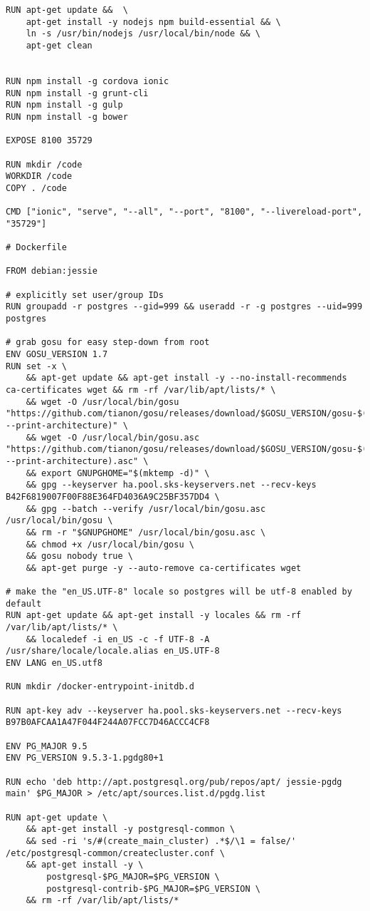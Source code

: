 \documentclass[
	12pt,				%
	openright,			%
	oneside,			%
	a4paper,			%
	chapter=TITLE,		%
	section=TITLE,		%
	english,			%
	french,				%
	spanish,			%
	brazil				%
	]{abntex2}
\begin{document}
\begin{apendicesenv}
\begin{lstlisting}
RUN apt-get update &&  \
    apt-get install -y nodejs npm build-essential && \
    ln -s /usr/bin/nodejs /usr/local/bin/node && \ 
    apt-get clean


RUN npm install -g cordova ionic
RUN npm install -g grunt-cli
RUN npm install -g gulp
RUN npm install -g bower

EXPOSE 8100 35729

RUN mkdir /code
WORKDIR /code
COPY . /code

CMD ["ionic", "serve", "--all", "--port", "8100", "--livereload-port", "35729"]

# Dockerfile

FROM debian:jessie

# explicitly set user/group IDs
RUN groupadd -r postgres --gid=999 && useradd -r -g postgres --uid=999 postgres

# grab gosu for easy step-down from root
ENV GOSU_VERSION 1.7
RUN set -x \
	&& apt-get update && apt-get install -y --no-install-recommends ca-certificates wget && rm -rf /var/lib/apt/lists/* \
	&& wget -O /usr/local/bin/gosu "https://github.com/tianon/gosu/releases/download/$GOSU_VERSION/gosu-$(dpkg --print-architecture)" \
	&& wget -O /usr/local/bin/gosu.asc "https://github.com/tianon/gosu/releases/download/$GOSU_VERSION/gosu-$(dpkg --print-architecture).asc" \
	&& export GNUPGHOME="$(mktemp -d)" \
	&& gpg --keyserver ha.pool.sks-keyservers.net --recv-keys B42F6819007F00F88E364FD4036A9C25BF357DD4 \
	&& gpg --batch --verify /usr/local/bin/gosu.asc /usr/local/bin/gosu \
	&& rm -r "$GNUPGHOME" /usr/local/bin/gosu.asc \
	&& chmod +x /usr/local/bin/gosu \
	&& gosu nobody true \
	&& apt-get purge -y --auto-remove ca-certificates wget

# make the "en_US.UTF-8" locale so postgres will be utf-8 enabled by default
RUN apt-get update && apt-get install -y locales && rm -rf /var/lib/apt/lists/* \
	&& localedef -i en_US -c -f UTF-8 -A /usr/share/locale/locale.alias en_US.UTF-8
ENV LANG en_US.utf8

RUN mkdir /docker-entrypoint-initdb.d

RUN apt-key adv --keyserver ha.pool.sks-keyservers.net --recv-keys B97B0AFCAA1A47F044F244A07FCC7D46ACCC4CF8

ENV PG_MAJOR 9.5
ENV PG_VERSION 9.5.3-1.pgdg80+1

RUN echo 'deb http://apt.postgresql.org/pub/repos/apt/ jessie-pgdg main' $PG_MAJOR > /etc/apt/sources.list.d/pgdg.list

RUN apt-get update \
	&& apt-get install -y postgresql-common \
	&& sed -ri 's/#(create_main_cluster) .*$/\1 = false/' /etc/postgresql-common/createcluster.conf \
	&& apt-get install -y \
		postgresql-$PG_MAJOR=$PG_VERSION \
		postgresql-contrib-$PG_MAJOR=$PG_VERSION \
	&& rm -rf /var/lib/apt/lists/*


\end{lstlisting}
\end{apendicesenv}
\end{document}
